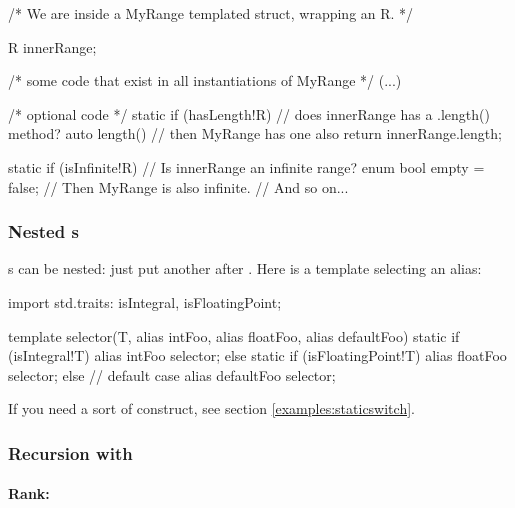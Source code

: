 \begin{dcode}
/* We are inside a MyRange templated struct, wrapping an R. */

    R innerRange;

/* some code that exist in all instantiations of MyRange */
(...)

/* optional code */
static if (hasLength!R) // does innerRange has a .length() method?
    auto length()       // then MyRange has one also
    {
        return innerRange.length;
    }

static if (isInfinite!R)     // Is innerRange an infinite range?
    enum bool empty = false; // Then MyRange is also infinite.
// And so on...
\end{dcode}

\subsubsection{Nested s}

s can be nested: just put another  after . Here is a template selecting an alias:

\begin{dcode}
import std.traits: isIntegral, isFloatingPoint;

template selector(T, alias intFoo, alias floatFoo, alias defaultFoo)
{
    static if (isIntegral!T)
       alias intFoo selector;
    else static if (isFloatingPoint!T)
       alias floatFoo selector; 
    else // default case
        alias defaultFoo selector;
}
\end{dcode}

If you need a sort of  construct, see section \ref{examples:staticswitch}.

\subsubsection{Recursion with }\label{staticifrecursion}

\paragraph{Rank:}\label{rank}

